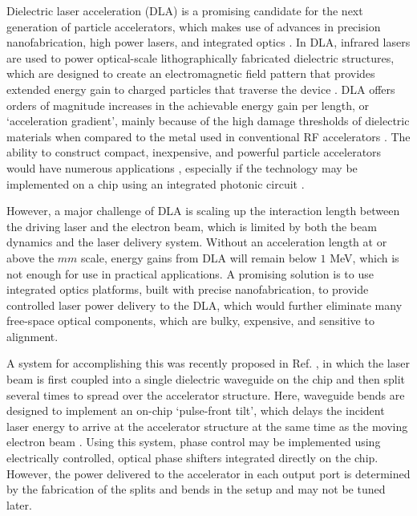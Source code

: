 \documentclass[%
 reprint,
 amsmath,amssymb,
 aps,
prstab,
floatfix,
]{revtex4-1}
\begin{document}
Dielectric laser acceleration (DLA) is a promising candidate for the next generation of particle accelerators, which makes use of advances in precision nanofabrication, high power lasers, and integrated optics \cite{peralta_demonstration_2013,breuer_laser-based_2013,breuer_dielectric_2014,leedle_dielectric_2015,leedle_laser_2015,wootton_demonstration_2016}.  In DLA, infrared lasers are used to power optical-scale lithographically fabricated dielectric structures, which are designed to create an electromagnetic field pattern that provides extended energy gain to charged particles that traverse the device \cite{plettner_proposed_2006,hughes_method_2017}.  DLA offers orders of magnitude increases in the achievable energy gain per length, or `acceleration gradient', mainly because of the high damage thresholds of dielectric materials when compared to the metal used in conventional RF accelerators \cite{soong_laser_2013}.  The ability to construct compact, inexpensive, and powerful particle accelerators would have numerous applications \cite{england_dielectric_2014,wootton_dielectric_2016,wootton_towards_2017}, especially if the technology may be implemented on a chip using an integrated photonic circuit \cite{hughes_-chip_2017}.

However, a major challenge of DLA is scaling up the interaction length between the driving laser and the electron beam, which is limited by both the beam dynamics and the laser delivery system.  Without an acceleration length at or above the $mm$ scale, energy gains from DLA will remain below $1$ MeV, which is not enough for use in practical applications.  A promising solution is to use integrated optics platforms, built with precise nanofabrication, to provide controlled laser power delivery to the DLA, which would further eliminate many free-space optical components, which are bulky, expensive, and sensitive to alignment.  

A system for accomplishing this was recently proposed in Ref. \cite{hughes_method_2017}, in which the laser beam is first coupled into a single dielectric waveguide on the chip and then split several times to spread over the accelerator structure.  Here, waveguide bends are designed to implement an on-chip `pulse-front tilt', which delays the incident laser energy to arrive at the accelerator structure at the same time as the moving electron beam \cite{plettner_proposed_2006,wei_dual-grating_2017,cesar_optical_2018}.  Using this system, phase control may be implemented using electrically controlled, optical phase shifters integrated directly on the chip.  However, the power delivered to the accelerator in each output port is determined by the fabrication of the splits and bends in the setup and may not be tuned later.
\end{document}
